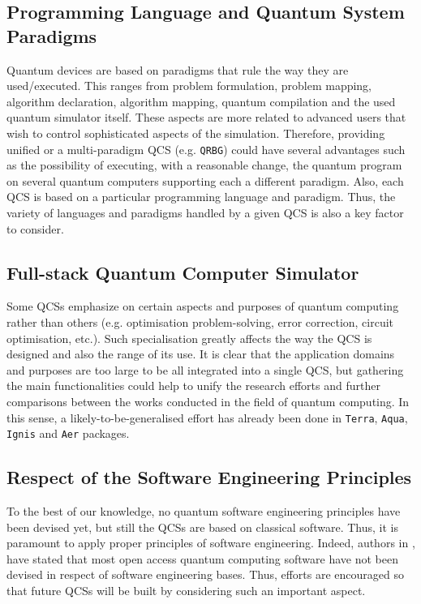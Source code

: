 \documentclass[conference]{IEEEtran}
\begin{document}
\subsection{Programming Language and Quantum System Paradigms}
Quantum devices are based on paradigms that rule the way they are used/executed. This ranges from problem formulation, problem mapping, algorithm declaration, algorithm mapping, quantum compilation and the used quantum simulator itself. These aspects are more related to advanced users that wish to control sophisticated aspects of the simulation. Therefore, providing unified or a multi-paradigm QCS (e.g. \texttt{QRBG}) could have several advantages such as the possibility of executing, with a reasonable change, the quantum program on several quantum computers supporting each a different paradigm. Also, each QCS is based on a particular programming language and paradigm. Thus, the variety of languages and paradigms handled by a given QCS is also a key factor to consider. 


\subsection{Full-stack Quantum Computer Simulator}
Some QCSs emphasize on certain aspects and purposes of quantum computing rather than others (e.g. optimisation problem-solving, error correction, circuit optimisation, etc.). Such specialisation greatly affects the way the QCS is designed and also the range of its use. It is clear that the application domains and purposes are too large to be all integrated into a single QCS, but gathering the main functionalities could help to unify the research efforts and further comparisons between the works conducted in the field of quantum computing. In this sense, a likely-to-be-generalised effort has already been done in \texttt{Terra}, \texttt{Aqua}, \texttt{Ignis} and \texttt{Aer} packages. 

\subsection{Respect of the Software Engineering Principles}
To the best of our knowledge, no quantum software engineering principles have been devised yet, but still the QCSs are based on classical software. Thus, it is paramount to apply proper principles of software engineering. Indeed, authors in \cite{ref_1}, have stated that most open access quantum computing software have not been devised in respect of software engineering bases. Thus, efforts are encouraged so that future QCSs will be built by considering such an important aspect. 
\end{document}
